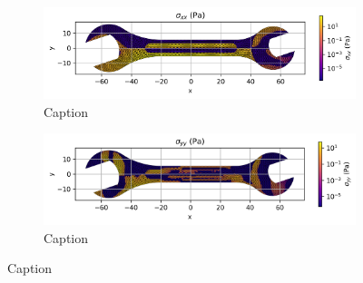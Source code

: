   \begin{figure}[H]
    \centering
    \begin{subfigure}[t]{0.49\textwidth}
      \centering
      \includegraphics[width=\textwidth]{GRAFICOS/Case c - sigma_xx_per_element.png}
      \caption{Caption}
      \label{fig:deformada_reacciones}
    \end{subfigure}
    \hfill
    \begin{subfigure}[t]{0.49\textwidth}
      \centering
      \includegraphics[width=\textwidth]{GRAFICOS/Case c - sigma_yy_per_element.png}
      \caption{Caption}
      \label{fig:von_mises}
    \end{subfigure}
    \caption{Caption}
    \label{fig:analisis_estructural}
  \end{figure}

